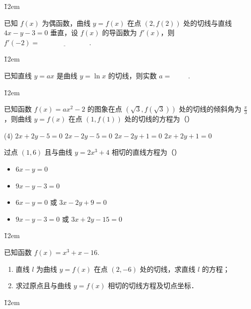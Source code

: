 \v{12em}

\begin{example}
    已知 $f(x)$ 为偶函数，曲线 $y = f(x)$ 在点 $(2,f(2))$ 处的切线与直线 $4x - y - 3 = 0$ 垂直，设 $f(x)$ 的导函数为 $f'(x)$，则 $f'(-2) = \underline{\hspace{3cm}}$.
\end{example}

\v{12em}

\begin{example}
    已知直线 $y=a x$ 是曲线 $y=\ln x$ 的切线，则实数 $a=$ \underline{$\qquad$}.
\end{example}

\v{12em}

\begin{example}
    已知函数 $f(x)=a x^2-2$ 的图象在点 $(\sqrt{3}, f(\sqrt{3}))$ 处的切线的倾斜角为 $\frac{\pi}{3}$ ，则曲线 $y=f(x)$ 在点 $(1, f(1))$ 处的切线的方程为（\quad）
    \begin{tasks}(4)
        \task $2 x+2 y-5=0$
        \task $2 x-2 y-5=0$
        \task $2 x-2 y+1=0$
        \task $2 x+2 y+1=0$
    \end{tasks}
\end{example}

\begin{example}
    过点 $(1,6)$ 且与曲线 $y=2 x^3+4$ 相切的直线方程为（\quad）
    \begin{itemize}
        \item $6 x-y=0$
        \item $9 x-y-3=0$
        \item $6 x-y=0$ 或 $3 x-2 y+9=0$
        \item $9 x-y-3=0$ 或 $3 x+2 y-15=0$
    \end{itemize}
\end{example}

\v{12em}

\begin{example}
    已知函数 $f(x) = x^{3} + x - 16$.
    \begin{enumerate}
        \item[(1)] 直线 $l$ 为曲线 $y = f(x)$ 在点 $(2, -6)$ 处的切线，求直线 $l$ 的方程；
        \item[(2)] 求过原点且与曲线 $y = f(x)$ 相切的切线方程及切点坐标．
    \end{enumerate}
\end{example}

\v{12em}
